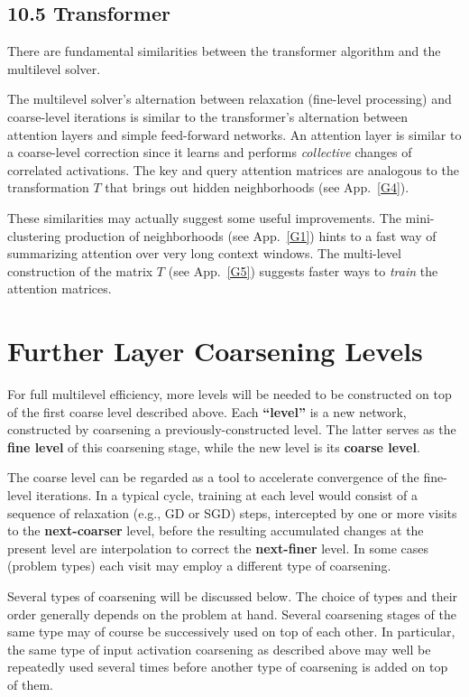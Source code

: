 \documentclass{article} %
\begin{document}
\subsection{10.5 Transformer}
There are fundamental similarities between the transformer algorithm \cite{transformer} and the multilevel solver.

The multilevel solver's alternation between relaxation (fine-level processing) and coarse-level iterations is similar to the transformer's alternation between attention layers and simple feed-forward networks. An attention layer is similar to a coarse-level correction since it learns and performs {\it collective} changes of correlated activations. The key and query attention matrices are analogous to the transformation $T$ that brings out hidden neighborhoods (see App.~\ref{G4}).

These similarities may actually suggest some useful improvements. The mini-clustering production of neighborhoods (see App.~\ref{G1}) hints to a fast way of summarizing attention over very long context windows. The multi-level construction of the matrix $T$ (see App.~\ref{G5}) suggests faster ways to {\it train} the attention matrices.

\section{Further Layer Coarsening Levels}
\label{sec:further_coarsening}
For full multilevel efficiency, more levels will be needed to be constructed on top of the first coarse level described above. Each \textbf{``level''} is a new network, constructed by coarsening a previously-constructed level. The latter serves as the \textbf{fine level} of this coarsening stage, while the new level is its \textbf{coarse level}.

The coarse level can be regarded as a tool to accelerate convergence of the fine-level iterations. In a typical cycle, training at each level would consist of a sequence of relaxation (e.g., GD or SGD) steps, intercepted by one or more visits to the \textbf{next-coarser} level, before the resulting accumulated changes at the present level are interpolation to correct the \textbf{next-finer} level. In some cases (problem types) each visit may employ a different type of coarsening.

Several types of coarsening will be discussed below. The choice of types and their order generally depends on the problem at hand.  Several coarsening stages of the same type may of course be successively used on top of each other. In particular, the same type of input activation coarsening as described above may well be repeatedly used several times before another type of coarsening is added on top of them.
\end{document}
